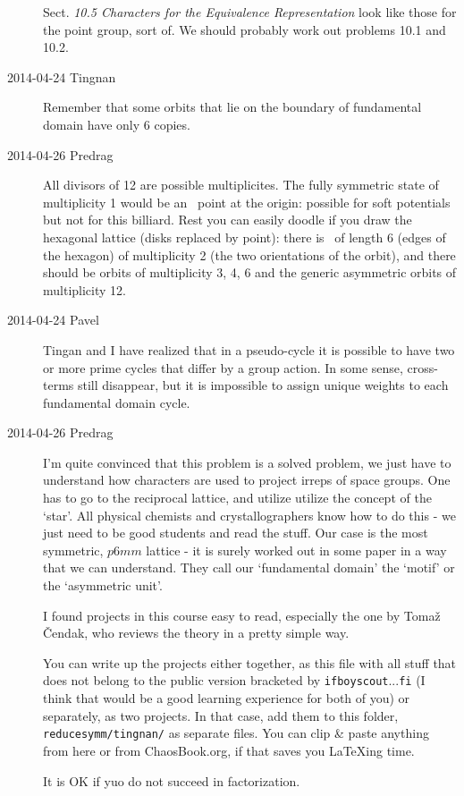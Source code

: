 \documentclass[pre,preprint,groupedaddress,showpacs,showkeys]{revtex4}
\begin{document}
\begin{description}
Sect. {\em 10.5 Characters for the Equivalence Representation} look
like those for the point group, sort of. We should probably work
out problems 10.1 and 10.2.

\item[2014-04-24 Tingnan]
Remember that some orbits that lie on the boundary of fundamental domain
have only 6 copies.

\item[2014-04-26 Predrag]
All divisors of 12 are possible multiplicites. The fully symmetric state
of multiplicity 1 would be an \eqv\ point at the origin: possible for
soft potentials but not for this billiard. Rest you can easily doodle if
you draw the hexagonal lattice (disks replaced by point): there is \po\
of length 6 (edges of the hexagon) of multiplicity 2 (the two
orientations of the orbit), and there should be orbits of multiplicity 3,
4, 6 and the generic asymmetric orbits of multiplicity 12.

\item[2014-04-24 Pavel]
Tingan and I have realized that in a
pseudo-cycle it is possible to have two or more prime cycles that differ
by a group action. In some sense, cross-terms still disappear, but it is
impossible to assign unique weights to each fundamental domain cycle.

\item[2014-04-26 Predrag]
I'm quite convinced that this problem is a solved problem, we just have
to understand how characters are used to project irreps of space groups.
One has to go to the reciprocal lattice, and utilize utilize the concept
of the `star'. All physical chemists and crystallographers know how to do
this - we just need to be good students and read the stuff. Our case is
the most symmetric, $p6mm$ lattice - it is surely worked out in some
paper in a way that we can understand. They call our `fundamental domain'
the `motif' or the `asymmetric unit'.

I found projects in
{this course} easy to read, especially the one by
Toma\v{z} \v{C}endak, who reviews the theory in a pretty simple way.

You can write up the projects either together, as this file
with all stuff that does not belong to the public version
bracketed by \texttt{ifboyscout}...\texttt{fi} (I think that would be a good
learning experience for both of you) or separately, as two projects.
In that case, add them to this folder, \texttt{reducesymm/tingnan/} as
separate files. You can clip \& paste anything from here or from
ChaosBook.org, if that saves you LaTeXing time.

It is OK if yuo do not succeed in factorization.

\end{description}
\fi %
\end{document}

